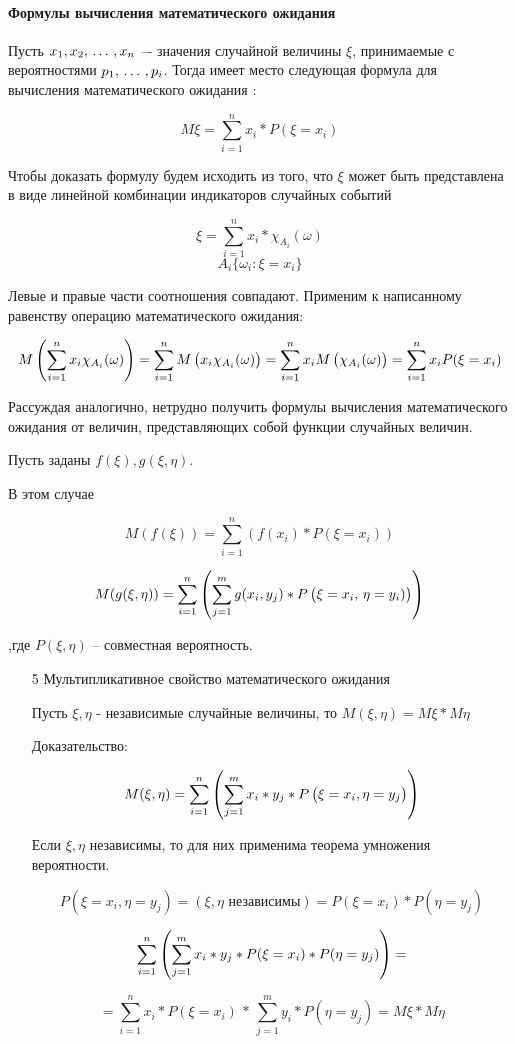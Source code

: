 \documentclass[a4paper,twoside,12pt]{report}
\begin{document}
\paragraph{Формулы вычисления математического ожидания}

	Пусть $x_1,x_2, \,\ldots\, ,x_n$ –-  значения случайной величины $\xi$, принимаемые с вероятностями $p_1, \,\ldots\, ,p_i$. Тогда имеет место следующая формула для вычисления математического ожидания :

	$$
	  M\xi=\sum^n_{i=1}x_i*P(\xi=x_i)
	$$

	Чтобы доказать формулу будем исходить из того, что $\xi$ может быть представлена в виде линейной комбинации индикаторов случайных событий

	$$
	  \xi = \sum^n_{i=1}x_i*\chi_{A_i}(\omega)
	$$ $$
	  A_i \{\omega_i : \xi = x_i\}
	$$

	Левые и правые части соотношения совпадают. Применим к написанному равенству операцию математического ожидания: 

	$$	
	  M\left(\sum^n_{i=1}x_i\chi_{A_i}(\omega)\right) 
	    = \sum^n_{i=1}M\left(x_i\strut\chi_{A_i}(\omega)\right) 
	    = \sum^n_{i=1}x_iM\left(\strut\chi_{A_i}(\omega)\right) 
	    = \sum^n_{i=1}x_iP(\xi=x_i)	
	$$

	Рассуждая аналогично, нетрудно получить формулы вычисления математического ожидания от величин, представляющих собой функции случайных величин. 

	Пусть заданы $f(\xi),g(\xi,\eta)$.

	В этом случае 

	$$
	  M(f(\xi)) = \sum^n_{i=1}(f(x_i)*P(\xi=x_i)) 
	$$

	$$
	  M(g(\xi,\eta)) = \sum^n_{i=1}
	    \left(   
	      \sum^m_{j=1}g(x_i,y_j)*P
	        \left(
	          \xi=x_i,\strut\,\eta=y_i)
	        \right)
	    \right) 
	$$

	,где $P(\xi,\eta)$ – совместная вероятность.


	\begin{enumerate}

	\item[5] Мультипликативное свойство математического ожидания

		Пусть $\xi,\eta$ - независимые случайные величины, то $M(\xi,\eta) =  M\xi * M\eta$

		Доказательство:

		$$
		  M(\xi,\eta) = \sum^n_{i=1}
		    \left(
		      \sum^m_{j=1}x_i*y_j*\strut P
		        \left(
		          \xi=x_i,\strut\eta=y_j
		        \right)
		    \right)
		$$

		Если $\xi,\eta$ независимы, то для них применима теорема умножения вероятности. 

		$$
		  P(\xi=x_i,\eta=y_j) 
		    = (\xi,\eta \mbox{ независимы})
		    = P(\xi=x_i)*P(\eta=y_j)
		$$
		
		$$
		  \sum^n_{i=1}
		    \left(
		      \sum^m_{j=1}x_i*y_j*\strut P(\xi=x_i)*P(\eta=y_j)
		    \right)
		  =
		$$
		
		$$
		  = \sum^n_{i=1}x_i*P(\xi=x_i)  \, * \, 
		    \sum^m_{j=1}y_i*P(\eta=y_j) 
		  = M\xi*M\eta
		$$

	\end{enumerate}
\end{document}
